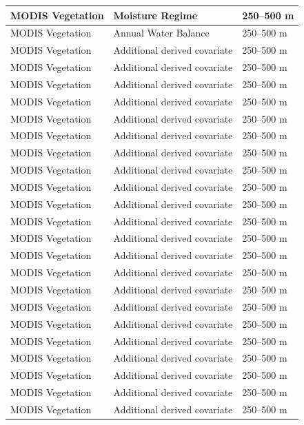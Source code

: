 \documentclass[
  10pt,
  b5paper,
  oneside]{book}
\begin{document}
\begin{table}
\begin{tabular}[t]{l|l|l}
\hline
MODIS Vegetation & Moisture Regime & 250–500 m\\
\hline
MODIS Vegetation & Annual Water Balance & 250–500 m\\
\hline
MODIS Vegetation & Additional derived covariate & 250–500 m\\
\hline
MODIS Vegetation & Additional derived covariate & 250–500 m\\
\hline
MODIS Vegetation & Additional derived covariate & 250–500 m\\
\hline
MODIS Vegetation & Additional derived covariate & 250–500 m\\
\hline
MODIS Vegetation & Additional derived covariate & 250–500 m\\
\hline
MODIS Vegetation & Additional derived covariate & 250–500 m\\
\hline
MODIS Vegetation & Additional derived covariate & 250–500 m\\
\hline
MODIS Vegetation & Additional derived covariate & 250–500 m\\
\hline
MODIS Vegetation & Additional derived covariate & 250–500 m\\
\hline
MODIS Vegetation & Additional derived covariate & 250–500 m\\
\hline
MODIS Vegetation & Additional derived covariate & 250–500 m\\
\hline
MODIS Vegetation & Additional derived covariate & 250–500 m\\
\hline
MODIS Vegetation & Additional derived covariate & 250–500 m\\
\hline
MODIS Vegetation & Additional derived covariate & 250–500 m\\
\hline
MODIS Vegetation & Additional derived covariate & 250–500 m\\
\hline
MODIS Vegetation & Additional derived covariate & 250–500 m\\
\hline
MODIS Vegetation & Additional derived covariate & 250–500 m\\
\hline
MODIS Vegetation & Additional derived covariate & 250–500 m\\
\hline
MODIS Vegetation & Additional derived covariate & 250–500 m\\
\hline
MODIS Vegetation & Additional derived covariate & 250–500 m\\
\hline
MODIS Vegetation & Additional derived covariate & 250–500 m\\
\hline
MODIS Vegetation & Additional derived covariate & 250–500 m\\
\hline

\end{tabular}
\end{table}
\end{document}
